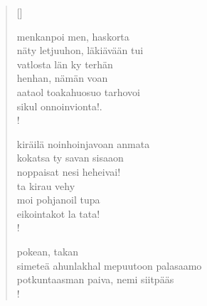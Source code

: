\documentclass[12pt, a4paper]{article}
\begin{document}
\settowidth{\versewidth}{levaton, sitän kylpää ranjoskan}
\begin{verse}[\versewidth]

menkanpoi men, haskorta \\
näty letjuuhon, läkiävään tui \\
vatlosta län ky terhän \\
henhan, nämän voan \\
aataol toakahuosuo tarhovoi \\
sikul onnoinvionta!. \\!



kiräilä noinhoinjavoan anmata \\
kokatsa ty savan sisaaon \\
noppaisat nesi heheivai! \\
ta kirau vehy \\
moi pohjanoil tupa \\
eikointakot la tata! \\!



pokean, takan \\
simeteä ahunlakhal mepuutoon palasaamo \\
potkuntaasman paiva, nemi siitpääs \\!


\end{verse}
\newpage
\end{document}
